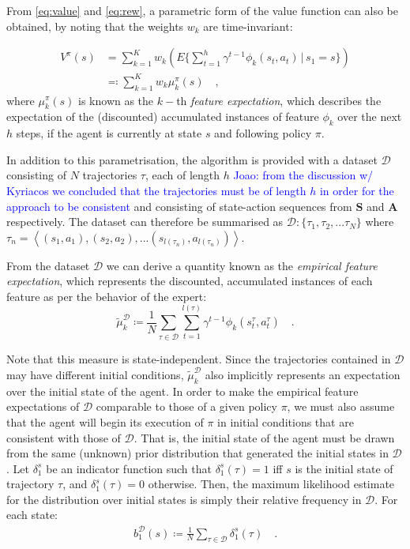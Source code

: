 \documentclass[letterpaper]{article}
\newcommand{\jm}[1]{\textcolor{blue}{Joao: #1}}
\newcommand{\jm}[1]{}
\begin{document}
From \eqref{eq:value} and \eqref{eq:rew}, a parametric form of the value function can also be obtained, by noting that the weights $w_k$ are time-invariant:

\begin{align}
 	V^{\pi}(s) &= \sum^K_{k=1}w_k\left(E\{\sum_{t = 1}^h \gamma^{t-1}\phi_k(s_t,a_t)\,\vert\, s_1 = s\}\right)\\
&\eqqcolon\sum^K_{k=1}w_k\mu^\pi_k(s)\quad,
\end{align}
where $\mu^{\pi}_k(s)$ is known as the $k-$th \emph{feature expectation}, which describes the expectation of the (discounted) accumulated instances of feature $\phi_k$ over the next $h$ steps, if the agent is currently at state $s$ and following policy $\pi$.

In addition to this parametrisation, the algorithm is provided with a dataset ${\mathcal{D}}$ consisting of $N$ trajectories $\tau$, each of length $h$ \jm{from the discussion w/ Kyriacos we concluded that the trajectories must be of length $h$ in order for the approach to be consistent} and consisting of state-action sequences from $\mathbf{S}$ and $\mathbf{A}$ respectively. The dataset can therefore be summarised as $\mathcal{D}:\big\{ \tau_1,\tau_2,...\tau_N \big\}$ where $\tau_n = \left<(s_1,a_1),(s_2,a_2),...(s_{l({\tau_n})},a_{l({\tau_n})})\right>$.

From the dataset ${\mathcal{D}}$ we can derive a quantity known as the \emph{empirical feature expectation}, which represents the discounted, accumulated instances of each feature as per the behavior of the expert:
\begin{equation}
	\widetilde{\mu}^{\mathcal{D}}_k \coloneqq\frac{1}{N}\sum_{\tau\in\mathcal{D}}\sum_{t=1}^{l({\tau})}\gamma^{t-1}\phi_k(s^\tau_t,a^\tau_t)\quad. \label{eqn:empirical_fe}
\end{equation}

Note that this measure is state-independent. Since the trajectories contained in $\mathcal{D}$ may have different initial conditions, $\widetilde{\mu}^{\mathcal{D}}_k$ also implicitly represents an expectation over the initial state of the agent. In order to make the empirical feature expectations of $\mathcal{D}$ comparable to those of a given policy $\pi$, we must also assume that the agent will begin its execution of $\pi$ in initial conditions that are consistent with those of $\mathcal{D}$. That is, the initial state of the agent must be drawn from the same (unknown) prior distribution that generated the initial states in $\mathcal{D}$. Let $\delta_1^s$ be an indicator function such that $\delta_1^s(\tau) = 1$ iff $s$ is the initial state of trajectory $\tau$, and $\delta_1^s(\tau) = 0$ otherwise. Then, the maximum likelihood estimate for the distribution over initial states is simply their relative frequency in $\mathcal{D}$. For each state:
\begin{align}
  \label{eq:initial_belief}
  b_1^{\mathcal D}(s)\coloneqq \frac{1}{N}\sum_{\tau\in\mathcal{D}}\delta_1^s(\tau)\quad.
\end{align}
\end{document}
